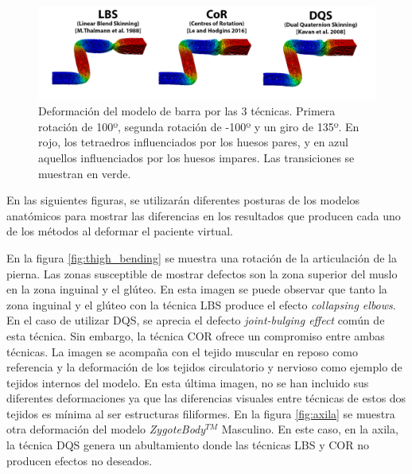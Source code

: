 \begin{figure}[h]%
  \centering
  \includegraphics[width=\textwidth]{IMG/BarraCoR}
    \caption{Deformación del modelo de barra por las 3 técnicas. Primera rotación de 100º, segunda rotación de -100º y un giro de 135º. En rojo, los tetraedros influenciados por los huesos pares, y en azul aquellos influenciados por los huesos impares. Las transiciones se muestran en verde.}
    \label{fig:bar_bending}
\end{figure}

En las siguientes figuras, se utilizarán diferentes posturas de los modelos anatómicos para mostrar las diferencias en los resultados que producen cada uno de los métodos al deformar el paciente virtual.

En la figura \ref{fig:thigh_bending} se muestra una rotación de la articulación de la pierna. Las zonas susceptible de mostrar defectos son la zona superior del muslo en la zona inguinal y el glúteo. En esta imagen se puede observar que tanto la zona inguinal y el glúteo con la técnica \ac{LBS} produce el efecto \emph{collapsing elbows}. En el caso de utilizar \ac{DQS}, se aprecia el defecto \emph{joint-bulging effect} común de esta técnica. Sin embargo, la técnica \ac{COR} ofrece un compromiso entre ambas técnicas. La imagen se acompaña con el tejido muscular en reposo como referencia y la deformación de los tejidos circulatorio y nervioso como ejemplo de tejidos internos del modelo. En esta última imagen, no se han incluido sus diferentes deformaciones ya que las diferencias visuales entre técnicas de estos dos tejidos es mínima al ser estructuras filiformes. En la figura \ref{fig:axila} se muestra otra deformación del modelo \emph{ZygoteBody}$^{TM}$ Masculino. En este caso, en la axila, la técnica \ac{DQS} genera un abultamiento donde las técnicas \ac{LBS} y \ac{COR} no producen efectos no deseados.




